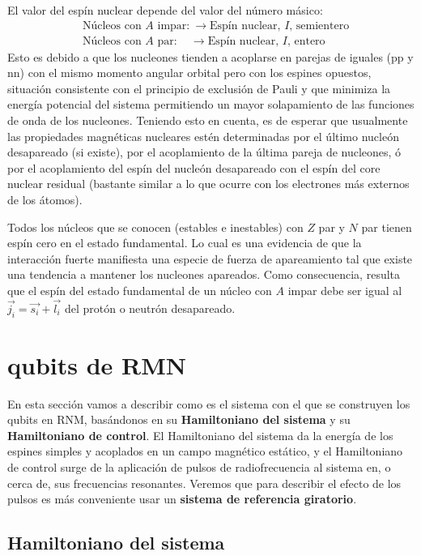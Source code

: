 El valor del espín nuclear depende del valor del número másico:
\begin{align*}
& \text{Núcleos con }A \text{ impar:} ~ \longrightarrow \text{Espín nuclear, } I \text{, semientero}   \\
& \text{Núcleos con }A \text{ par:} ~~~ \,\, \, \longrightarrow \text{Espín nuclear, } I \text{, entero}
\end{align*}
Esto es debido a que los nucleones tienden a acoplarse en parejas de iguales (pp y nn) con el mismo momento angular orbital pero con los espines opuestos, situación consistente con el principio de exclusión de Pauli y que minimiza la energía potencial del sistema permitiendo un mayor solapamiento de las funciones de onda de los nucleones. Teniendo esto en cuenta, es de esperar que usualmente las propiedades magnéticas nucleares estén determinadas por el último nucleón desapareado (si existe), por el acoplamiento de la última pareja de nucleones, ó por el acoplamiento del espín del nucleón desapareado con el espín del core nuclear residual (bastante similar a lo que ocurre con los electrones más externos de los átomos).

Todos los núcleos que se conocen (estables e inestables) con $Z$ par y $N$ par tienen espín cero en el estado fundamental. Lo cual es una evidencia de que la interacción fuerte manifiesta una especie de fuerza de apareamiento tal que existe una tendencia a mantener los nucleones apareados. Como consecuencia, resulta que el espín del estado fundamental de un núcleo con $A$ impar debe ser igual al $\vec{j_i} = \vec{s_i} + \vec{l_i}$ del protón o neutrón desapareado.


	
	\section{qubits de RMN} 

En esta sección vamos a describir como es el sistema con el que se construyen los qubits en RNM, basándonos en su \textbf{Hamiltoniano del sistema} y su \textbf{Hamiltoniano de control}. El Hamiltoniano del sistema da la energía de los espines simples y acoplados en un campo magnético estático, y el Hamiltoniano de control surge de la aplicación de pulsos de radiofrecuencia al sistema en, o cerca de, sus frecuencias resonantes. Veremos que para describir el efecto de los pulsos es más conveniente usar un \textbf{sistema de referencia giratorio}.


		\subsection{Hamiltoniano del sistema} \label{sec_subsub_Harware_NMR_H_sys}


